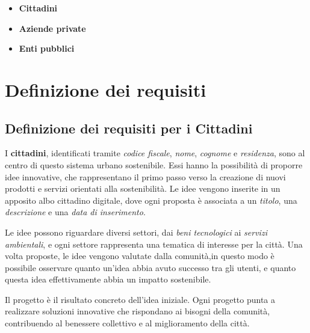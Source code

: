 \documentclass{article}
\begin{document}
\begin{itemize}
    \item \textbf{Cittadini}
    \item \textbf{Aziende private}
    \item \textbf{Enti pubblici}
\end{itemize}


\section{Definizione dei requisiti}


\subsection{Definizione dei requisiti per i Cittadini}

I \textbf{cittadini}, identificati tramite \textit{codice fiscale}, \textit{nome}, \textit{cognome} e \textit{residenza}, sono al centro di questo sistema urbano sostenibile. Essi hanno la possibilità di proporre idee innovative, che rappresentano il primo passo verso la creazione di nuovi prodotti e servizi orientati alla sostenibilità. Le idee vengono inserite in un apposito albo cittadino digitale, dove ogni proposta è associata a un \textit{titolo}, una \textit{descrizione} e una \textit{data di inserimento}.

\par\vspace{0.3cm}

Le idee possono riguardare diversi settori, dai \textit{beni tecnologici} ai \textit{servizi ambientali}, e ogni settore rappresenta una tematica di interesse per la città. Una volta proposte, le idee vengono valutate dalla comunità,in questo modo è possibile osservare quanto un'idea abbia avuto successo tra gli utenti, e quanto questa idea effettivamente abbia un impatto sostenibile.

\par\vspace{0.3cm}

Il progetto è il risultato concreto dell’idea iniziale. Ogni progetto punta a realizzare soluzioni innovative che rispondano ai bisogni della comunità, contribuendo al benessere collettivo e al miglioramento della città.
\end{document}
